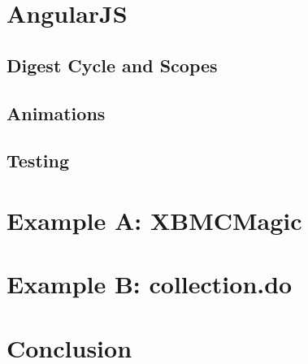 

\chapter{AngularJS}


\section{Digest Cycle and Scopes}

\section{Animations}
\section{Testing}

\chapter{Example A: XBMCMagic}
\label{ch:xbmc}





\chapter{Example B: collection.do}
\label{ch:collection}






\chapter{Conclusion}

